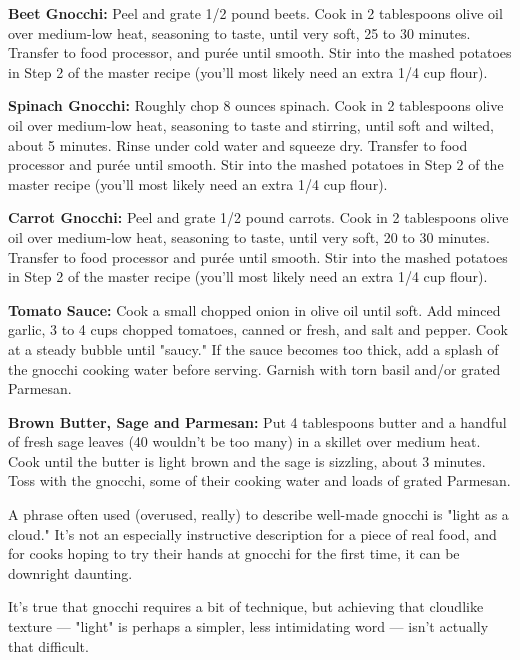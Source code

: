 \textbf{Beet Gnocchi:} Peel and grate 1/2 pound beets. Cook in 2
tablespoons olive oil over medium-low heat, seasoning to taste, until
very soft, 25 to 30 minutes. Transfer to food processor, and purée
until smooth. Stir into the mashed potatoes in Step 2 of the master
recipe (you’ll most likely need an extra 1/4 cup flour).

\textbf{Spinach Gnocchi:} Roughly chop 8 ounces spinach. Cook in 2
tablespoons olive oil over medium-low heat, seasoning to taste and
stirring, until soft and wilted, about 5 minutes. Rinse under cold
water and squeeze dry. Transfer to food processor and purée until
smooth. Stir into the mashed potatoes in Step 2 of the master recipe
(you’ll most likely need an extra 1/4 cup flour).

\textbf{Carrot Gnocchi:} Peel and grate 1/2 pound carrots. Cook in 2
tablespoons olive oil over medium-low heat, seasoning to taste, until
very soft, 20 to 30 minutes. Transfer to food processor and purée
until smooth. Stir into the mashed potatoes in Step 2 of the master
recipe (you’ll most likely need an extra 1/4 cup flour).


\textbf{Tomato Sauce:} Cook a small chopped onion in olive oil until
soft. Add minced garlic, 3 to 4 cups chopped tomatoes, canned or
fresh, and salt and pepper. Cook at a steady bubble until "saucy." If
the sauce becomes too thick, add a splash of the gnocchi cooking water
before serving. Garnish with torn basil and/or grated Parmesan.

\textbf{Brown Butter, Sage and Parmesan:} Put 4 tablespoons butter and
a handful of fresh sage leaves (40 wouldn’t be too many) in a skillet
over medium heat. Cook until the butter is light brown and the sage is
sizzling, about 3 minutes. Toss with the gnocchi, some of their
cooking water and loads of grated Parmesan.


A phrase often used (overused, really) to describe well-made gnocchi
is "light as a cloud." It’s not an especially instructive description
for a piece of real food, and for cooks hoping to try their hands at
gnocchi for the first time, it can be downright daunting.

It’s true that gnocchi requires a bit of technique, but achieving that
cloudlike texture — "light" is perhaps a simpler, less intimidating
word — isn’t actually that difficult.

